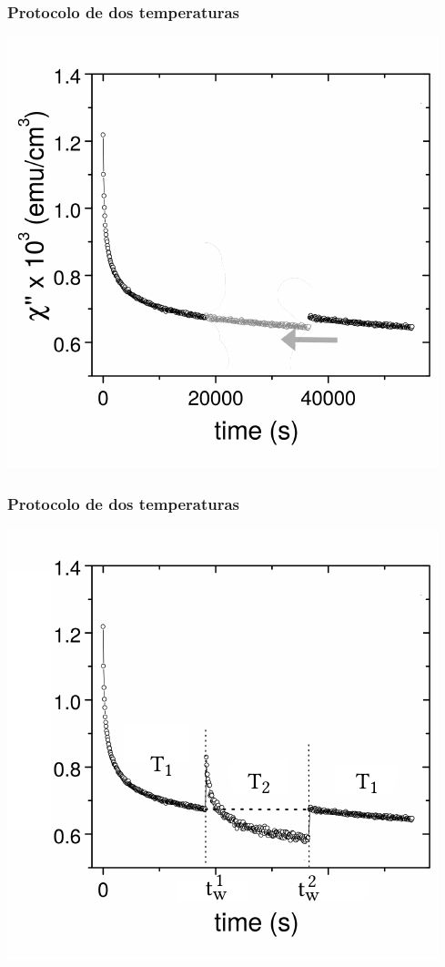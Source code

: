 \documentclass{beamer}
\begin{document}
\begin{frame}
  \frametitle{Protocolo de dos temperaturas}
  \begin{center}
    \includegraphics{images/threetempsprotocol_empalma.pdf}
  \end{center}
\end{frame}

\begin{frame}
  \frametitle{Protocolo de dos temperaturas}
  \begin{center}
    \includegraphics{images/threetempsprotocol_defs.pdf}
  \end{center}
\end{frame}
\end{document}
